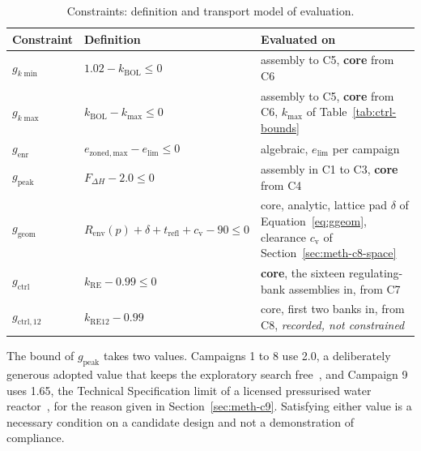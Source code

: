 \begin{table}[htbp]
  \centering
  \small
  \caption{Constraints: definition and transport model of evaluation.}
  \label{tab:constraints}
\begin{tabularx}{\textwidth}{
    >{\raggedright\arraybackslash}p{}
    >{\raggedright\arraybackslash}p{}
    >{\raggedright\arraybackslash}X
}
    \toprule
    Constraint & Definition & Evaluated on \\
    \midrule
    $g_{k\min}$ 
        & $1.02 - k_\mathrm{BOL} \le 0$
        & assembly to C5, \textbf{core} from C6 \\

    $g_{k\max}$ 
        & $k_\mathrm{BOL} - k_{\max} \le 0$
        & assembly to C5, \textbf{core} from C6, 
          $k_{\max}$ of Table~\ref{tab:ctrl-bounds} \\

    $g_\mathrm{enr}$ 
        & $e_\mathrm{zoned,max} - e_\mathrm{lim} \le 0$
        & algebraic, $e_\mathrm{lim}$ per campaign \\

    $g_\mathrm{peak}$ 
        & $F_{\Delta H} - 2.0 \le 0$
        & assembly in C1 to C3, \textbf{core} from C4 \\

    $g_\mathrm{geom}$ 
        & $R_\mathrm{env}(p) + \delta + t_\mathrm{refl} + c_\mathrm{v} - 90 \le 0$
        & core, analytic, lattice pad $\delta$ of
          Equation~\eqref{eq:ggeom}, clearance $c_\mathrm{v}$ of 
          Section~\ref{sec:meth-c8-space} \\

    $g_\mathrm{ctrl}$ 
        & $k_\mathrm{RE} - 0.99 \le 0$
        & \textbf{core}, the sixteen regulating-bank assemblies in,
          from C7 \\

    $g_\mathrm{ctrl,12}$ 
        & $k_\mathrm{RE12} - 0.99$
        & core, first two banks in, from C8, 
          \emph{recorded, not constrained} \\
    \bottomrule
\end{tabularx}
\end{table}

The bound of $g_\mathrm{peak}$ takes two values. Campaigns 1 to 8 use
2.0, a deliberately generous adopted value that keeps the exploratory
search free~\cite{epr_fsar_ch4}, and Campaign 9 uses 1.65, the
Technical Specification limit of a licensed pressurised water
reactor~\cite{robinson_gd10}, for the reason given in
Section~\ref{sec:meth-c9}. Satisfying either value is a necessary
condition on a candidate design and not a demonstration of compliance.


